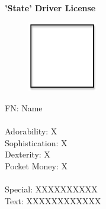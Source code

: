 \documentclass{article}
\begin{document}
	\begin{sideways}
		\begin{minipage}[2.4in]{3in}
			\textbf{'State' Driver License}\\
			\begin{figure}
				\vspace{-0.25in}
				\includegraphics[width=1.2in]{../square.png}
				\vspace{-0.35in}
			\end{figure}	
			FN: Name\\\\[0.02in]
			Adorability: X\\
			Sophistication: X\\
			Dexterity: X\\
			Pocket Money: X\\\\[0.02in]		
			Special: XXXXXXXXXX\\
			Text: XXXXXXXXXXXX
		\end{minipage}
	\end{sideways}
\end{document}
